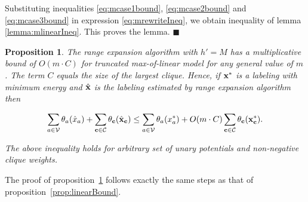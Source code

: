 \documentclass[10pt,letterpaper]{article}
\newtheorem{proposition}{Proposition}
\begin{document}
Substituting inequalities \eqref{eq:mcase1bound}, \eqref{eq:mcase2bound} and \eqref{eq:mcase3bound} in expression \eqref{eq:mrewriteIneq}, we obtain inequality of lemma \ref{lemma:mlinearIneq}. This proves the lemma. 
$\blacksquare$

\begin{proposition}
\label{prop:mlinearBound}
The range expansion algorithm with $h' = M$ has a multiplicative bound of $O(m \cdot C)$ for truncated max-of-linear model for any general value of $m$. The term $C$ equals the size of the largest clique. Hence, if ${\bf x}^*$ is a labeling with
minimum energy and $\hat{\bf x}$ is the labeling estimated by range expansion algorithm then

\begin{equation}
\small
\sum_{a \in {\cal V}} \theta_a(\hat{x}_a) + \sum_{{\bf c} \in {\cal C}} \theta_{\bf c}(\hat{\bf x}_{\bf c}) \leq \nonumber 
\sum_{a \in {\cal V}} \theta_a({x}^*_a) + O(m \cdot C) \sum_{{\bf c} \in {\cal C}} \theta_{\bf c}({\bf x}^*_{\bf c}).
\label{eq:mlinear_bound}
\end{equation}

The above inequality holds for arbitrary set of unary potentials and non-negative clique weights.
\end{proposition}

The proof of proposition~\ref{prop:mlinearBound} follows exactly the same steps as that of proposition~\ref{prop:linearBound}.


\clearpage
{\small


}
\end{document}

